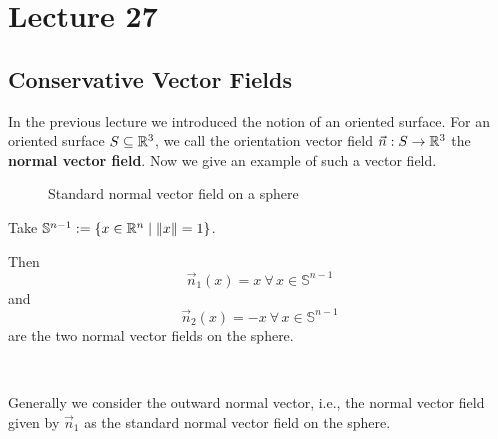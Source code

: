 \documentclass[../Analysis-3.tex]{subfiles}
\begin{document}
\chapter*{Lecture 27} %
\setcounter{chapter}{27} %
\setcounter{section}{0}

\section{Conservative Vector Fields}

In the previous lecture we introduced the notion of an oriented surface. For an oriented surface $S \subseteq \mathbb{R}^3$, we call the orientation vector field $\vec{n} : S \to \mathbb{R}^3$ the \textbf{normal vector field}. Now we give an example of such a vector field.

\begin{Eg}{}{}
  \begin{figure}
    \centering
    \caption{Standard normal vector field on a sphere}\label{fig1:27}
  \end{figure}
  Take $\mathbb{S}^{n-1} := \{ x \in \mathbb{R}^n \mid \norm{x} = 1 \}$.

  Then
  \[ \vec{n}_1(x) = x \ \forall \, x \in \mathbb{S}^{n-1} \] and
  \[ \vec{n}_2(x) = -x \ \forall \, x \in \mathbb{S}^{n-1} \]
  are the two normal vector fields on the sphere.

  \

  Generally we consider the outward normal vector, i.e., the normal vector field given by $\vec{n}_1$ as the standard normal vector field on the sphere.
\end{Eg}
\end{document}
